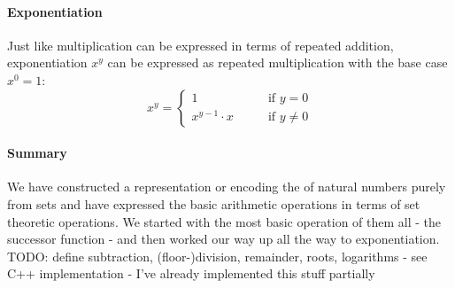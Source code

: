 \paragraph{Exponentiation} Just like multiplication can be expressed in terms of repeated addition, exponentiation $x^y$ can be expressed as repeated multiplication with the base case $x^0 = 1$:
\begin{equation}
x^y =\begin{cases}
 1                  & \qquad \text{if } y   =  0 \\
 x ^{y-1}  \cdot x  & \qquad \text{if } y \neq 0 
\end{cases}
\end{equation}

\paragraph{Summary} We have constructed a representation or encoding the of natural numbers purely from sets and have expressed the basic arithmetic operations in terms of set theoretic operations. We started with the most basic operation of them all - the successor function - and then worked our way up all the way to exponentiation. TODO: define subtraction, (floor-)division, remainder, roots, logarithms - see C++ implementation - I've already implemented this stuff partially








